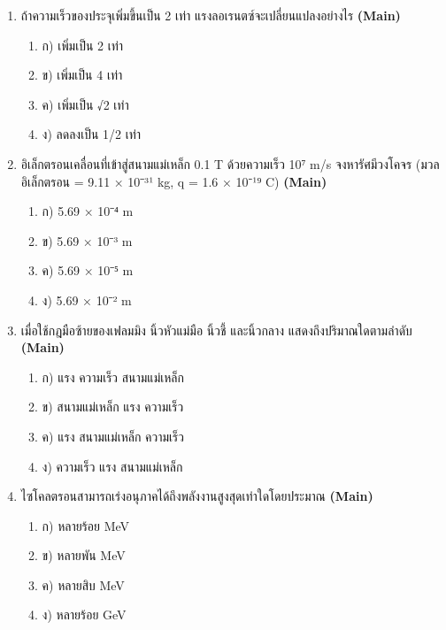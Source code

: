 \documentclass[12pt]{article}
\begin{document}
\begin{enumerate}[label=\arabic*.]
\begin{enumerate}[label=)]
\item ก) ความถี่เชิงมุมของการโคจร
\item ข) ความถี่เชิงมุมของการโคจรคูณ 2
\item ค) ความถี่เชิงมุมของการโคจรหาร 2
\item ง) ความถี่เชิงมุมของการโคจรหาร π
\end{enumerate}
\item ถ้าความเร็วของประจุเพิ่มขึ้นเป็น 2 เท่า แรงลอเรนตซ์จะเปลี่ยนแปลงอย่างไร \hfill \textbf{\small (Main)}
\begin{enumerate}[label=)]
\item ก) เพิ่มเป็น 2 เท่า
\item ข) เพิ่มเป็น 4 เท่า
\item ค) เพิ่มเป็น √2 เท่า
\item ง) ลดลงเป็น 1/2 เท่า
\end{enumerate}
\item อิเล็กตรอนเคลื่อนที่เข้าสู่สนามแม่เหล็ก 0.1 T ด้วยความเร็ว 10⁷ m/s จงหารัศมีวงโคจร (มวลอิเล็กตรอน = 9.11 × 10⁻³¹ kg, q = 1.6 × 10⁻¹⁹ C) \hfill \textbf{\small (Main)}
\begin{enumerate}[label=)]
\item ก) 5.69 × 10⁻⁴ m
\item ข) 5.69 × 10⁻³ m
\item ค) 5.69 × 10⁻⁵ m
\item ง) 5.69 × 10⁻² m
\end{enumerate}
\item เมื่อใช้กฎมือซ้ายของเฟลมมิง นิ้วหัวแม่มือ นิ้วชี้ และนิ้วกลาง แสดงถึงปริมาณใดตามลำดับ \hfill \textbf{\small (Main)}
\begin{enumerate}[label=)]
\item ก) แรง ความเร็ว สนามแม่เหล็ก
\item ข) สนามแม่เหล็ก แรง ความเร็ว
\item ค) แรง สนามแม่เหล็ก ความเร็ว
\item ง) ความเร็ว แรง สนามแม่เหล็ก
\end{enumerate}
\item ไซโคลตรอนสามารถเร่งอนุภาคได้ถึงพลังงานสูงสุดเท่าใดโดยประมาณ \hfill \textbf{\small (Main)}
\begin{enumerate}[label=)]
\item ก) หลายร้อย MeV
\item ข) หลายพัน MeV
\item ค) หลายสิบ MeV
\item ง) หลายร้อย GeV
\end{enumerate}

\end{enumerate}
\end{document}
